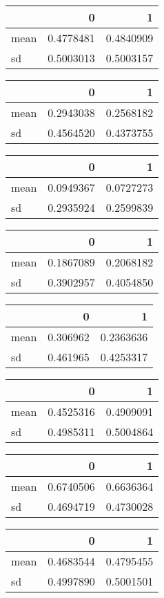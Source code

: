 \documentclass[]{article}
\begin{document}
\begin{table}[H]
\begin{tabular}[t]{lrr}
  & 0 & 1\\
\midrule
mean & 0.4778481 & 0.4840909\\
sd & 0.5003013 & 0.5003157\\
\bottomrule
\end{tabular}
\centering
\begin{tabular}[t]{lrr}
\toprule
  & 0 & 1\\
\midrule
mean & 0.2943038 & 0.2568182\\
sd & 0.4564520 & 0.4373755\\
\bottomrule
\end{tabular}
\centering
\begin{tabular}[t]{lrr}
\toprule
  & 0 & 1\\
\midrule
mean & 0.0949367 & 0.0727273\\
sd & 0.2935924 & 0.2599839\\
\bottomrule
\end{tabular}
\centering
\begin{tabular}[t]{lrr}
\toprule
  & 0 & 1\\
\midrule
mean & 0.1867089 & 0.2068182\\
sd & 0.3902957 & 0.4054850\\
\bottomrule
\end{tabular}
\centering
\begin{tabular}[t]{lrr}
\toprule
  & 0 & 1\\
\midrule
mean & 0.306962 & 0.2363636\\
sd & 0.461965 & 0.4253317\\
\bottomrule
\end{tabular}
\centering
\begin{tabular}[t]{lrr}
\toprule
  & 0 & 1\\
\midrule
mean & 0.4525316 & 0.4909091\\
sd & 0.4985311 & 0.5004864\\
\bottomrule
\end{tabular}
\centering
\begin{tabular}[t]{lrr}
\toprule
  & 0 & 1\\
\midrule
mean & 0.6740506 & 0.6636364\\
sd & 0.4694719 & 0.4730028\\
\bottomrule
\end{tabular}
\centering
\begin{tabular}[t]{lrr}
\toprule
  & 0 & 1\\
\midrule
mean & 0.4683544 & 0.4795455\\
sd & 0.4997890 & 0.5001501\\
\bottomrule
\end{tabular}
\end{table}
\end{document}
